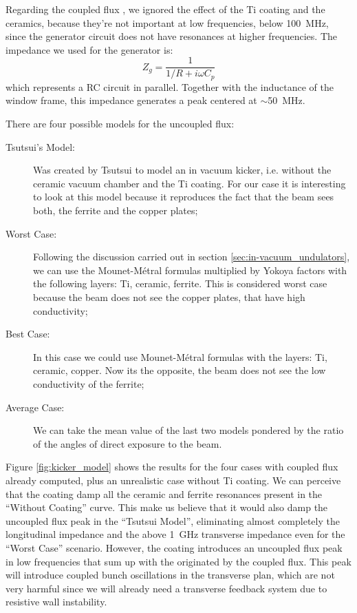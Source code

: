 Regarding the coupled flux \cite{NassibianSacherer1979, VoelkerLambertson1989, DavinoHahn2003}, we ignored the effect of the Ti coating and the ceramics, because they're not important at low frequencies, below \SI{100}{\mega\hertz}, since the generator circuit does not have resonances at higher frequencies. The impedance we used for the generator is:
\begin{equation}
 Z_g = \frac{1}{1/R + i\omega C_p}
\end{equation}
which represents a RC circuit in parallel. Together with the inductance of the window frame, this impedance generates a peak centered at $\sim$\SI{50}{\mega\hertz}.


There are four possible models for the uncoupled flux:
\begin{description}
 \item[Tsutsui's Model:] Was created by Tsutsui \cite{tsutsui2000, tsutsui_vos2000} to model an in vacuum kicker, i.e. without the ceramic vacuum chamber and the Ti coating. For our case it is interesting to look at this model because it reproduces the fact that the beam sees both, the ferrite and the copper plates;
 \item[Worst Case:] Following the discussion carried out in section \ref{sec:in-vacuum_undulators}, we can use the Mounet-Métral formulas  multiplied by Yokoya factors with the following layers: Ti, ceramic, ferrite. This is considered worst case because the beam does not see the copper plates, that have high conductivity;
 \item[Best Case:] In this case we could use Mounet-Métral formulas with the layers: Ti, ceramic, copper. Now its the opposite, the beam does not see the low conductivity of the ferrite;
 \item[Average Case:] We can take the mean value of the last two models pondered by the ratio of the angles of direct exposure to the beam.
\end{description}

Figure \ref{fig:kicker_model} shows the results for the four cases with coupled flux already computed, plus an unrealistic case without Ti coating. We can perceive that the coating damp all the ceramic and ferrite resonances present in the ``Without Coating'' curve. This make us believe that it would also damp the uncoupled flux peak in the ``Tsutsui Model'', eliminating almost completely the longitudinal impedance and the above \SI{1}{\giga\hertz} transverse impedance even for the ``Worst Case'' scenario. However, the coating introduces an uncoupled flux peak in low frequencies that sum up with the originated by the coupled flux. This peak will introduce coupled bunch oscillations in the transverse plan, which are not very harmful since we will already need a transverse feedback system due to resistive wall instability.

